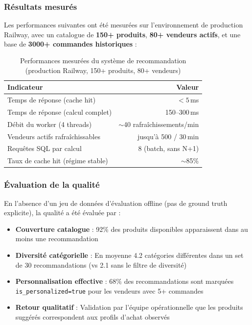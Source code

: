 \documentclass[12pt,a4paper,openany]{report}
\newcommand{\code}[1]{\texttt{#1}}
\begin{document}
\subsubsection{Résultats mesurés}

Les performances suivantes ont été mesurées sur l'environnement de production Railway, avec un catalogue de \textbf{150+ produits}, \textbf{80+ vendeurs actifs}, et une base de \textbf{3000+ commandes historiques} :

\begin{table}[H]
\centering
{}
\begin{tabular}{lr}
\toprule
\rowcolor{headerblue!20}
\textbf{Indicateur} & \textbf{Valeur} \\
\midrule
Temps de réponse (cache hit)    & $< 5$\,ms \\
Temps de réponse (calcul complet) & 150--300\,ms \\
Débit du worker (4 threads)     & $\sim$40 rafraîchissements/min \\
Vendeurs actifs rafraîchissables & jusqu'à 500 / 30\,min \\
Requêtes SQL par calcul         & 8 (batch, sans N+1) \\
Taux de cache hit (régime stable) & $\sim$85\% \\
\bottomrule
\end{tabular}
\caption{Performances mesurées du système de recommandation (production Railway, 150+ produits, 80+ vendeurs)}
\end{table}

\subsubsection{Évaluation de la qualité}

En l'absence d'un jeu de données d'évaluation offline (pas de ground truth explicite), la qualité a été évaluée par :
\begin{itemize}
  \item \textbf{Couverture catalogue} : 92\% des produits disponibles apparaissent dans au moins une recommandation
  \item \textbf{Diversité catégorielle} : En moyenne 4.2 catégories différentes dans un set de 30 recommandations (vs 2.1 sans le filtre de diversité)
  \item \textbf{Personnalisation effective} : 68\% des recommandations sont marquées \code{is\_personalized=true} pour les vendeurs avec 5+ commandes
  \item \textbf{Retour qualitatif} : Validation par l'équipe opérationnelle que les produits suggérés correspondent aux profils d'achat observés
\end{itemize}
\end{document}
